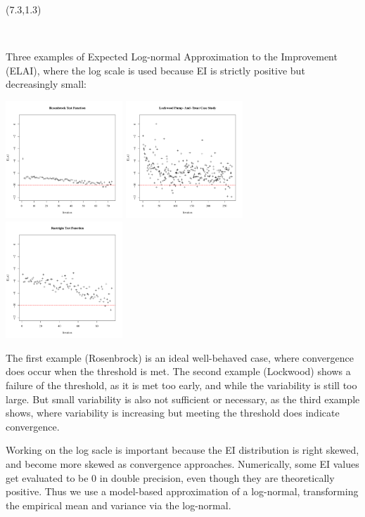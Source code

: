\documentclass[a0,landscape]{a0poster}
\newcommand{\co}[2]{{{\bf \color{#1}{#2}}}}
\begin{document}
\begin{textblock}{7.8}(7.3,1.3)

\begin{center}
\LARGE \textsc{\co{red}{Examples of EI Monitoring}}\\
\end{center}
\large

\noindent
Three examples of Expected Log-normal Approximation to the Improvement (ELAI),
where the log scale is used because EI is strictly positive but decreasingly
small:

\includegraphics[width=0.33\textwidth]{./figures/introChartRoseEasyEasyAxis.pdf}
\includegraphics[width=0.33\textwidth]{./figures/introChartLock6Three20000Axis.pdf}
\includegraphics[width=0.33\textwidth]{./figures/introChartRastHardAxis.pdf}


\noindent
The first example (Rosenbrock) is an ideal well-behaved case, where convergence
does occur when the threshold is met. The second example (Lockwood) shows a
failure of the threshold, as it is met too early, and while the
variability is still too large. But small variability is also not sufficient
or necessary, as the third example shows, where variability is increasing but 
meeting the threshold does indicate convergence.

\vspace{0.3in}
\noindent
Working on the log sacle is important because the EI distribution is right
skewed, and become more skewed as convergence approaches. Numerically, some
EI values get evaluated to be 0 in double precision, even though they
are theoretically positive. Thus we use a model-based approximation of a
log-normal, transforming the empirical mean and variance via the log-normal.
\end{textblock}
\end{document}
